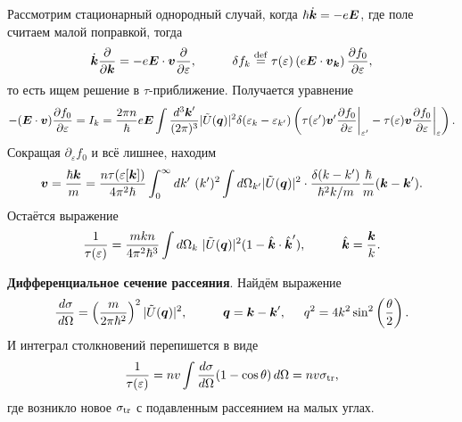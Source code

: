 Рассмотрим стационарный однородный случай, когда $\hbar \dot{\boldsymbol{k}} = - e \boldsymbol{E}$, где поле считаем малой поправкой, тогда
\begin{equation*}
	\dot{\vc{k}} \frac{\partial }{\partial \vc{k}}  = - e \vc{E} \cdot \vc{v} \frac{\partial }{\partial \varepsilon},
	\hspace{10 mm} 
	\delta f_k \overset{\mathrm{def}}{=}  \tau(\varepsilon) \left(e \vc{E} \cdot \vc{v}_{\vc{k}} \right) \frac{\partial f_0}{\partial \varepsilon},
\end{equation*}
то есть ищем решение в $\tau$-приближение. Получается уравнение
\begin{equation*}
	- (\boldsymbol{E} \cdot \boldsymbol{v}) \frac{\partial f_0}{\partial \varepsilon} = I_k = \frac{2\pi n}{\hbar} e \boldsymbol{E} \int \frac{d^3 \boldsymbol{k}'}{(2\pi)^3} |\tilde{U}(\boldsymbol{q})|^2 \delta(\varepsilon_k - \varepsilon_{k'}) \left(
		\tau (\varepsilon') \boldsymbol{v}' \frac{\partial f_0}{\partial \varepsilon} \bigg|_{\varepsilon'} 
		-
		\tau (\varepsilon) \boldsymbol{v} \frac{\partial f_0}{\partial \varepsilon} \bigg|_{\varepsilon}
	\right).
\end{equation*}
Сокращая $\partial_\varepsilon f_0$ и всё лишнее, находим
\begin{equation*}
	\boldsymbol{v} = \frac{\hbar \boldsymbol{k}}{m} = \frac{n \tau(\varepsilon[\boldsymbol{k}])}{4 \pi^2 \hbar} \int_{0}^{\infty} dk' \ (k')^2 \int d \Omega_{k'} |\tilde{U}(\boldsymbol{q})|^2 \cdot \frac{\delta(k-k')}{\hbar^2 k/m} \frac{\hbar}{m} (\boldsymbol{k}-\boldsymbol{k}').
\end{equation*}
Остаётся выражение
\begin{equation}
	\frac{1}{\tau(\varepsilon)} = \frac{m k n}{4 \pi^2 \hbar^3} \int d \Omega_k \ |\tilde{U}(\vc{q})|^2 (1 - \hat{\vc{k}} \cdot \hat{\vc{k}}'),
	\hspace{10 mm} 
	\hat{\vc{k}} = \frac{\vc{k}}{k}.
\end{equation}



\textbf{Дифференциальное сечение рассеяния}. Найдём выражение
\begin{equation*}
	\frac{\d \sigma}{\d \Omega} = \left(\frac{m}{2\pi \hbar^2}\right)^2 |\tilde{U}(\vc{q})|^2,
	\hspace{10 mm} 
	\vc{q} = \vc{k}-\vc{k}',
	\hspace{5 mm} 
	q^2 = 4 k^2 \sin^2 \left(\frac{\theta}{2}\right).
\end{equation*}
И интеграл столкновений перепишется в виде
\begin{equation}
	\frac{1}{\tau(\varepsilon)} = n v \int \frac{d \sigma}{d \Omega} (1-\cos \theta) \, d \Omega = n v \sigma_{\textnormal{tr}},
\end{equation}
где возникло новое $\sigma_{\textnormal{tr}}$ с подавленным рассеянием на малых углах. 


